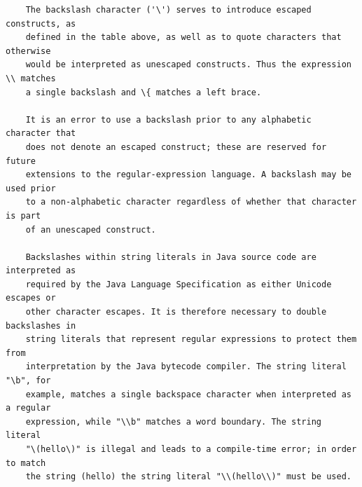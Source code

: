     \begin{verbatim}
    The backslash character ('\') serves to introduce escaped constructs, as
    defined in the table above, as well as to quote characters that otherwise
    would be interpreted as unescaped constructs. Thus the expression \\ matches
    a single backslash and \{ matches a left brace.

    It is an error to use a backslash prior to any alphabetic character that
    does not denote an escaped construct; these are reserved for future
    extensions to the regular-expression language. A backslash may be used prior
    to a non-alphabetic character regardless of whether that character is part
    of an unescaped construct.

    Backslashes within string literals in Java source code are interpreted as
    required by the Java Language Specification as either Unicode escapes or
    other character escapes. It is therefore necessary to double backslashes in
    string literals that represent regular expressions to protect them from
    interpretation by the Java bytecode compiler. The string literal "\b", for
    example, matches a single backspace character when interpreted as a regular
    expression, while "\\b" matches a word boundary. The string literal
    "\(hello\)" is illegal and leads to a compile-time error; in order to match
    the string (hello) the string literal "\\(hello\\)" must be used.
    \end{verbatim}












